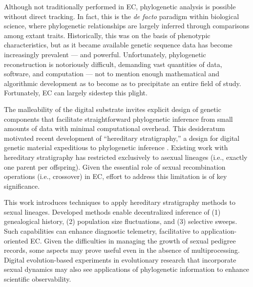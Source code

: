 Although not traditionally performed in EC, phylogenetic analysis is possible without direct tracking.
In fact, this is the \textit{de facto} paradigm within biological science, where phylogenetic relationships are largely inferred through comparisons among extant traits.
Historically, this was on the basis of phenotypic characteristics, but as it became available genetic sequence data has become increasingly prevalent --- and powerful.
Unfortunately, phylogenetic reconstruction is notoriously difficult, demanding vast quantities of data, software, and computation --- not to mention enough mathematical and algorithmic development as to become as to precipitate an entire field of study.
Fortunately, EC can largely sidestep this plight.

The malleability of the digital substrate invites explicit design of genetic components that facilitate straightforward phylogenetic inference from small amounts of data with minimal computational overhead.
This desideratum motivated recent development of ``hereditary stratigraphy,'' a design for digital genetic material expeditious to phylogenetic inference \citep{moreno2022hereditary}.
Existing work with hereditary stratigraphy has restricted exclusively to asexual lineages (i.e., exactly one parent per offspring).
Given the essential role of sexual recombination operations (i.e., crossover) in EC, effort to address this limitation is of key significance.

This work introduces techniques to apply hereditary stratigraphy methods to sexual lineages.
Developed methods enable decentralized inference of (1) genealogical history, (2) population size fluctuations, and (3) selective sweeps.
Such capabilities can enhance diagnostic telemetry, facilitative to application-oriented EC.
Given the difficulties in managing the growth of sexual pedigree records, some aspects may prove useful even in the absence of multiprocessing.
Digital evolution-based experiments in evolutionary research that incorporate sexual dynamics may also see applications of phylogenetic information to enhance scientific observability.
